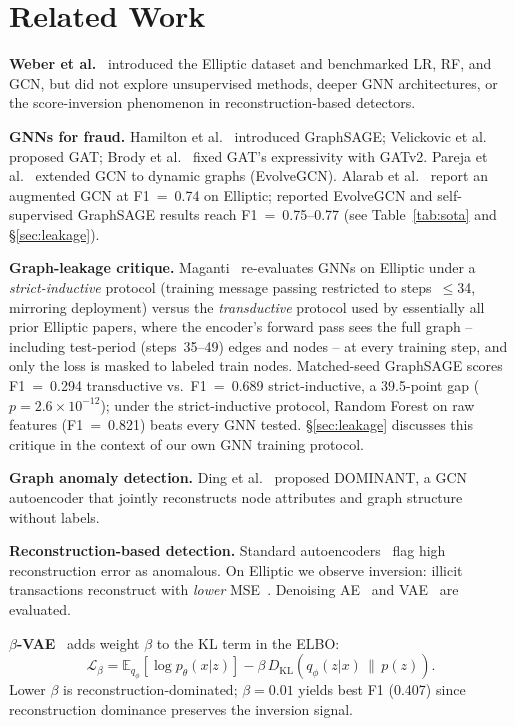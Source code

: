 \documentclass[conference]{IEEEtran}
\begin{document}
\section{Related Work}

\textbf{Weber et al.}~\cite{weber2019} introduced the Elliptic dataset and
benchmarked LR, RF, and GCN, but did not explore unsupervised methods, deeper
GNN architectures, or the score-inversion phenomenon in reconstruction-based
detectors.

\textbf{GNNs for fraud.}  Hamilton et al.~\cite{hamilton2017} introduced
GraphSAGE; Velickovic et al.~\cite{velickovic2018} proposed GAT; Brody et
al.~\cite{brody2022} fixed GAT's expressivity with GATv2.  Pareja et
al.~\cite{pareja2020evolve} extended GCN to dynamic graphs (EvolveGCN).
Alarab et al.~\cite{alarab2020} report an augmented GCN at F1~=~0.74 on
Elliptic; reported EvolveGCN and self-supervised GraphSAGE results reach
F1~=~0.75--0.77 (see Table~\ref{tab:sota} and \S\ref{sec:leakage}).

\textbf{Graph-leakage critique.}  Maganti~\cite{maganti2026} re-evaluates
GNNs on Elliptic under a \emph{strict-inductive} protocol (training message
passing restricted to steps~$\leq$34, mirroring deployment) versus the
\emph{transductive} protocol used by essentially all prior Elliptic papers,
where the encoder's forward pass sees the full graph -- including
test-period (steps~35--49) edges and nodes -- at every training step, and
only the loss is masked to labeled train nodes. Matched-seed GraphSAGE
scores F1~=~0.294 transductive vs.\ F1~=~0.689 strict-inductive, a
39.5-point gap ($p{=}2.6\times10^{-12}$); under the strict-inductive
protocol, Random Forest on raw features (F1~=~0.821) beats every GNN
tested. \S\ref{sec:leakage} discusses this critique in the context of our
own GNN training protocol.

\textbf{Graph anomaly detection.}  Ding et al.~\cite{ding2019dominant}
proposed DOMINANT, a GCN autoencoder that jointly reconstructs node attributes
and graph structure without labels.

\textbf{Reconstruction-based detection.}  Standard autoencoders~\cite{hawkins2002}
flag high reconstruction error as anomalous.  On Elliptic we observe inversion:
illicit transactions reconstruct with \emph{lower} MSE~\cite{zhou2017}.
Denoising AE~\cite{vincent2008} and VAE~\cite{kingma2014} are evaluated.

\textbf{$\beta$-VAE}~\cite{higgins2017beta} adds weight $\beta$ to the KL
term in the ELBO:
\begin{equation}
\mathcal{L}_{\beta} =
\mathbb{E}_{q_\phi}\!\left[\log p_\theta(x|z)\right]
- \beta\,D_{\text{KL}}\!\left(q_\phi(z|x)\,\|\,p(z)\right).
\label{eq:bvae}
\end{equation}
Lower $\beta$ is reconstruction-dominated; $\beta{=}0.01$ yields best F1
(0.407) since reconstruction dominance preserves the inversion signal.
\end{document}
